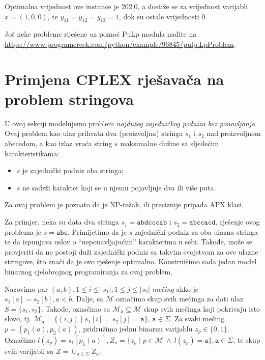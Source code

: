 \documentclass[a4paper, utf8, 11pt, colorlinks]{book}
\begin{document}
 Optimalna vrijednost ove instance je 202.0, a dostiže se za vrijednost varijabli $x = (1, 0, 0)$, te $y_{11}= y_{12}= y_{13} = 1$, dok su ostale vrijednosti 0.
 
 Još neke probleme riješene uz pomoć PuLp modula nađite na \url{https://www.programcreek.com/python/example/96845/pulp.LpProblem}. 
 \section{Primjena CPLEX rješavača na problem stringova}
 
 U ovoj sekciji modelujemo problem \emph{najdužeg zajedničkog podniza bez ponavljanja}. Ovaj problem kao ulaz prihvata dva (proizvoljna) stringa $s_1$ i $s_2$ nad proizvoljnom abecedom, a kao izlaz vraća string $s$ maksimalne dužine sa sljedećim karakteristikama:  
 \begin{itemize}
 	\item $s$ je zajednički podniz oba stringa; 
 	\item $s$ ne sadrži karakter koji se u njemu pojavljuje dva ili više puta.
 \end{itemize}
Za ovaj problem je poznato da je NP-težak, ili preciznije pripada APX klasi.  

Za primjer, neka su data dva stringa $s_1 = \texttt{abdcccab}$ i $s_2=\texttt{abccacd}$, rješenje ovog problema je $s=\texttt{abc}$. Primijetimo da je $s$ zajednički podniz za oba ulazna stringa te da ispunjava uslov o ``neponavljajućim'' karakterima u sebi. Takođe, može se provjeriti da ne postoji duži zajednički podniz sa takvim svojstvom za ove ulazne stringove, što znači da je ovo rješenje optimalno. Konstruišimo sada jedan model binarnog cjelobrojnog programiranja za ovaj problem. 

Nazovimo par $(a, b), 1 \leq i \leq |s_1|, 1 \leq j \leq |s_2|$ \emph{mečing} akko je $s_1[a]=s_2[b], a < b$. Dalje, sa $\mathcal{M}$ označimo skup svih mečinga za dati ulaz $S=\{s_1, s_2\}$. Takođe, označimo sa  $\mathcal{M}_{\texttt{a}} \subseteq \mathcal{M}$  skup svih mečinga koji pokrivaju isto slovo, tj. 
$\mathcal{M}_{\texttt{a}} = \{ (i, j) \mid s_1[i]=s_2[j]=\texttt{a}\}$, $\texttt{a} \in \Sigma$. Za svaki mečing $p=(p_1(a),p_2(a))$, pridružimo jednu binarnu varijablu $z_{p} \in \{0, 1\}$. Označimo $l(z_p)= s_1[ p_1(a) ], Z_{\texttt{a}} = \{ z_p \mid p \in \mathcal{M} \ \wedge\  l(z_p) = \texttt{a}\}, \texttt{a}\in \Sigma$, te skup svih varijabli sa $Z = \cup_{\texttt{a} \in \Sigma} Z_{\texttt{a}}$. 
\end{document}
